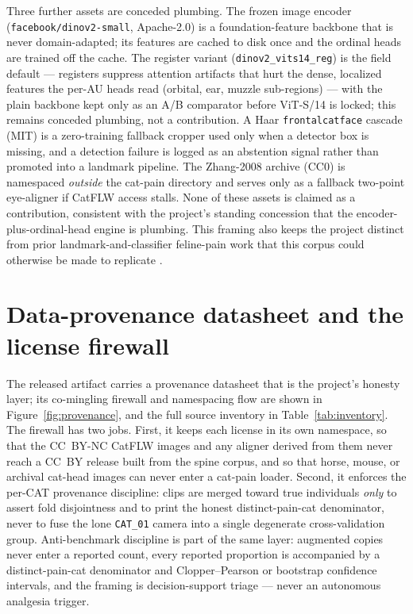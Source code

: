 Three further assets are conceded plumbing. The frozen image encoder
(\texttt{facebook/dinov2-small}, Apache-2.0) is a foundation-feature backbone
\citep{oquab2023dinov2} that is never domain-adapted; its features are cached to
disk once and the ordinal heads are trained off the cache. The register variant
(\texttt{dinov2\_vits14\_reg}) is the field default --- registers suppress
attention artifacts that hurt the dense, localized features the per-AU heads read
(orbital, ear, muzzle sub-regions) --- with the plain backbone kept only as an
A/B comparator before \mbox{ViT-S/14} is locked; this remains conceded plumbing,
not a contribution. A Haar
\texttt{frontalcatface} cascade (MIT) is a zero-training fallback cropper used
only when a detector box is missing, and a detection failure is logged as an
abstention signal rather than promoted into a landmark pipeline. The Zhang-2008
archive (CC0) is namespaced \emph{outside} the cat-pain directory and serves only
as a fallback two-point eye-aligner if CatFLW access stalls. None of these
assets is claimed as a contribution, consistent with the project's standing
concession that the encoder-plus-ordinal-head engine is plumbing. This framing
also keeps the project distinct from prior landmark-and-classifier feline-pain
work that this corpus could otherwise be made to replicate
\citep{feighelstein2023}.

\section{Data-provenance datasheet and the license firewall}
\label{sec:datasheet}

The released artifact carries a provenance datasheet that is the project's
honesty layer; its co-mingling firewall and namespacing flow are shown in
Figure~\ref{fig:provenance}, and the full source inventory in
Table~\ref{tab:inventory}. The firewall has two jobs. First, it keeps each
license in its own namespace, so that the CC~BY-NC CatFLW images and any aligner
derived from them never reach a CC~BY release built from the spine corpus, and
so that horse, mouse, or archival cat-head images can never enter a cat-pain
loader. Second, it enforces the per-CAT provenance discipline: clips are merged
toward true individuals \emph{only} to assert fold disjointness and to print the
honest distinct-pain-cat denominator, never to fuse the lone \texttt{CAT\_01}
camera into a single degenerate cross-validation group. Anti-benchmark
discipline is part of the same layer: augmented copies never enter a reported
count, every reported proportion is accompanied by a distinct-pain-cat
denominator and Clopper--Pearson or bootstrap confidence intervals, and the
framing is decision-support triage --- never an autonomous analgesia trigger.

